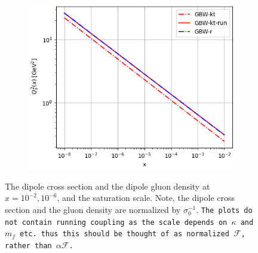 \documentclass[12pt]{article}
\numberwithin{equation}{section}
\numberwithin{table}{section}
\numberwithin{figure}{section}
\newcommand{\comment}[1]{\texttt{\color{red}#1}}
\begin{document}
\begin{figure}[t]
\begin{subfigure}{0.47\textwidth}
\includegraphics[width=\textwidth]{./plots/GBW-saturation.png}
\end{subfigure}
\caption{The dipole cross section and the dipole gluon density at
$x=10^{-2}, 10^{-6}$, and the saturation scale. 
Note, the dipole cross section and the gluon density are normalized by $\sigma_0^{-1}$.
\comment{The plots do not contain running coupling as the scale depends on $\kappa$ and $m_f$ etc. thus this should be thought of as normalized $\mathcal{F}$, rather than $\alpha\mathcal{F}$.}}
\label{fig:GBW}
\end{figure}
\end{document}
